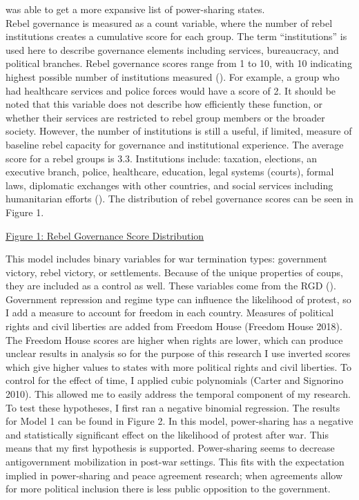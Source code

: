 \documentclass[11pt,]{article}
\begin{document}
was able to get a more expansive list of power-sharing states.\\
Rebel governance is measured as a count variable, where the number of
rebel institutions creates a cumulative score for each group. The term
``institutions'' is used here to describe governance elements including
services, bureaucracy, and political branches. Rebel governance scores
range from 1 to 10, with 10 indicating highest possible number of
institutions measured (\citet{huang_wartime_2016}). For example, a group
who had healthcare services and police forces would have a score of 2.
It should be noted that this variable does not describe how efficiently
these function, or whether their services are restricted to rebel group
members or the broader society. However, the number of institutions is
still a useful, if limited, measure of baseline rebel capacity for
governance and institutional experience. The average score for a rebel
groups is 3.3. Institutions include: taxation, elections, an executive
branch, police, healthcare, education, legal systems (courts), formal
laws, diplomatic exchanges with other countries, and social services
including humanitarian efforts (\citet{huang_wartime_2016}). The
distribution of rebel governance scores can be seen in Figure 1.

\href{C:/Users/Megan/Documents/CMPSPaper/Figure1}{Figure 1: Rebel
Governance Score Distribution}

This model includes binary variables for war termination types:
government victory, rebel victory, or settlements. Because of the unique
properties of coups, they are included as a control as well. These
variables come from the RGD (\citet{huang_wartime_2016}). Government
repression and regime type can influence the likelihood of protest, so I
add a measure to account for freedom in each country. Measures of
political rights and civil liberties are added from Freedom House
(Freedom House 2018). The Freedom House scores are higher when rights
are lower, which can produce unclear results in analysis so for the
purpose of this research I use inverted scores which give higher values
to states with more political rights and civil liberties. To control for
the effect of time, I applied cubic polynomials (Carter and Signorino
2010). This allowed me to easily address the temporal component of my
research.\\
To test these hypotheses, I first ran a negative binomial regression.
The results for Model 1 can be found in Figure 2. In this model,
power-sharing has a negative and statistically significant effect on the
likelihood of protest after war. This means that my first hypothesis is
supported. Power-sharing seems to decrease antigovernment mobilization
in post-war settings. This fits with the expectation implied in
power-sharing and peace agreement research; when agreements allow for
more political inclusion there is less public opposition to the
government.
\end{document}
